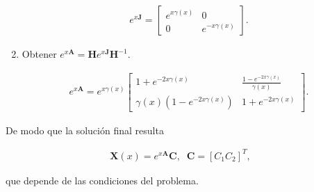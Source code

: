 \begin{enumerate}
	\begin{align}
	e^{x\textbf{J}} =  
	\begin{bmatrix}
	e^{x \gamma(x)} & 0 \\
	0 & e^{-x \gamma(x)}
	\end{bmatrix}.
	\end{align}
	
	\item Obtener $e^{x\textbf{A}} = \textbf{H} e^{x\textbf{J}} \textbf{H}^{-1}$.
	
	\begin{align}
	e^{x\textbf{A}} =  e^{x\gamma(x)}
	\begin{bmatrix}
	1+e^{-2x \gamma(x)} & \frac{1-e^{-2x\gamma(x)}}{\gamma(x)} \\
	\gamma(x) (1-e^{-2x\gamma(x)}) & 1+e^{-2x \gamma(x)}
	\end{bmatrix}.
	\end{align}
	
\end{enumerate}

De modo que la solución final resulta

\begin{align}
\textbf{X}(x) = e^{x\textbf{A}} \textbf{C}, \;\;\textbf{C} = [C_1 C_2]^{T},
\end{align}

que depende de las condiciones del problema.